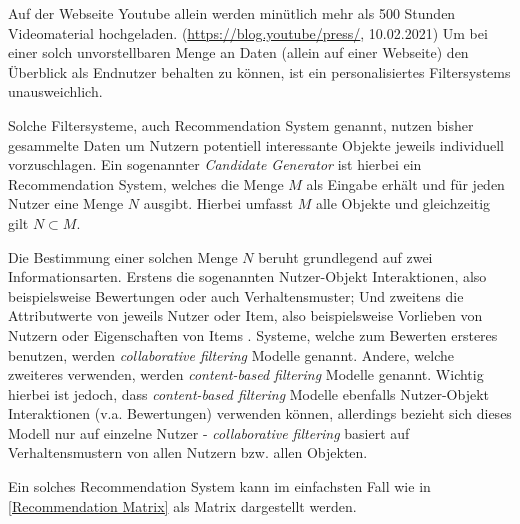 Auf der Webseite Youtube allein werden minütlich mehr als 500 Stunden Videomaterial hochgeladen. (\url{https://blog.youtube/press/}, 10.02.2021)
Um bei einer solch unvorstellbaren Menge an Daten (allein auf einer Webseite) den Überblick als Endnutzer behalten zu können, ist ein personalisiertes Filtersystems unausweichlich.

\noindent
Solche Filtersysteme, auch Recommendation System genannt, nutzen bisher gesammelte Daten um Nutzern potentiell interessante Objekte jeweils individuell vorzuschlagen.
Ein sogenannter \textit{Candidate Generator} ist hierbei ein Recommendation System, welches die Menge $M$ als Eingabe erhält und für jeden Nutzer eine Menge $N$ ausgibt. Hierbei umfasst $M$ alle Objekte und gleichzeitig gilt $N \subset M$. 

\noindent
Die Bestimmung einer solchen Menge $N$ beruht grundlegend auf zwei Informationsarten. Erstens die sogenannten Nutzer-Objekt Interaktionen, also beispielsweise Bewertungen oder auch Verhaltensmuster; Und zweitens die Attributwerte von jeweils Nutzer oder Item, also beispielsweise Vorlieben von Nutzern oder Eigenschaften von Items \cite{aggarwal2016}.
Systeme, welche zum Bewerten ersteres benutzen, werden \textit{collaborative filtering} Modelle genannt. Andere, welche zweiteres verwenden, werden \textit{content-based filtering} Modelle genannt. Wichtig hierbei ist jedoch, dass \textit{content-based filtering} Modelle ebenfalls Nutzer-Objekt Interaktionen (v.a. Bewertungen) verwenden können, allerdings bezieht sich dieses Modell nur auf einzelne Nutzer - \textit{collaborative filtering} basiert auf Verhaltensmustern von allen Nutzern bzw. allen Objekten.

\noindent
Ein solches Recommendation System kann im einfachsten Fall wie in \ref{Recommendation Matrix} als Matrix dargestellt werden.

